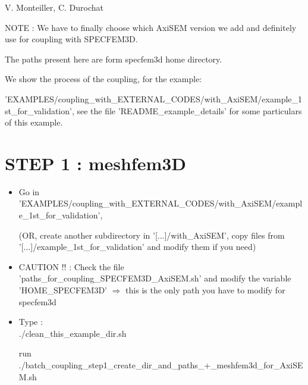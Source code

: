 \documentclass[11pt]{article}
\date{}
\begin{document}
{\huge { }}

\bigskip
\bigskip
\bigskip

 V. Monteiller, C. Durochat

\bigskip
\bigskip

\noindent NOTE : We have to finally choose which AxiSEM version we add and definitely use for coupling with SPECFEM3D.

\medskip

\noindent The paths present here are form specfem3d home directory.

\medskip


\medskip

\noindent We show the process of the coupling, for the example: 

\noindent 'EXAMPLES/coupling\_with\_EXTERNAL\_CODES/with\_AxiSEM/example\_1st\_for\_validation', see the file 'README\_example\_details' for some particulars of this example.

\bigskip

\section{STEP 1 : meshfem3D}

\begin{itemize}

\item[\textbullet] Go in 'EXAMPLES/coupling\_with\_EXTERNAL\_CODES/with\_AxiSEM/example\_1st\_for\_validation',

\smallskip

(OR, create another subdirectory in '[...]/with\_AxiSEM', copy files from '[...]/example\_1st\_for\_validation' and modify them if you need)

\item[\textbullet] {\color{red} CAUTION !! : Check the file 'paths\_for\_coupling\_SPECFEM3D\_AxiSEM.sh' and modify the variable 'HOME\_SPECFEM3D'} $\Longrightarrow$ this is the only path you have to modify for specfem3d

\item[\textbullet] Type : \\

\noindent ./clean\_this\_example\_dir.sh

\smallskip

\noindent run ./batch\_coupling\_step1\_create\_dir\_and\_paths\_+\_meshfem3d\_for\_AxiSEM.sh

\end{itemize}
\end{document}

